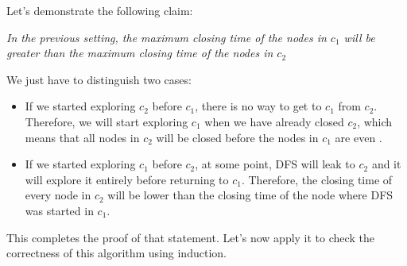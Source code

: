 \documentclass[12pt]{report}
\begin{document}
Let's demonstrate the following claim: 
\vspace{-5pt}
\begin{center}
	\itshape
	In the previous setting, the maximum closing time of the nodes in $c_1$ will
	be greater than the maximum closing time of the nodes in $c_2$
\end{center}
We just have to distinguish two cases:
\begin{itemize}
	\item
	If we started exploring $c_2$ before $c_1$, there is no way to get to $c_1$ from
	$c_2$. Therefore, we will start exploring $c_1$ when we have already closed $c_2$,
	which means that all nodes in $c_2$ will be closed before the nodes in $c_1$
	are even .
	\item
	If we started exploring $c_1$ before $c_2$, at some point, DFS will leak to 
	$c_2$ and it will explore it entirely before returning to $c_1$. Therefore,
	the closing time of every node in $c_2$ will be lower than the closing time
	of the node where DFS was started in $c_1$.
\end{itemize}
This completes the proof of that statement. Let's now apply it to check the correctness 
of this algorithm using induction. 
\end{document}
